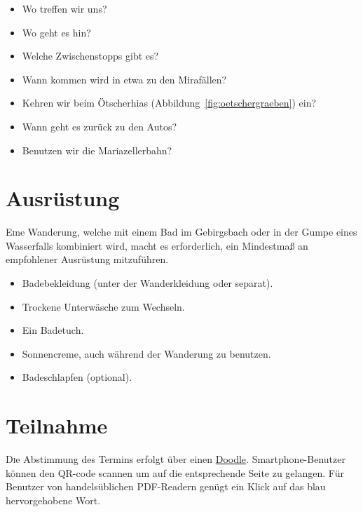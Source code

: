 \documentclass[twoside]{article}
\begin{document}
\begin{multicols}{2}
\begin{itemize}
    \item Wo treffen wir uns?
    \item Wo geht es hin?
    \item Welche Zwischenstopps gibt es?
    \item Wann kommen wird in etwa zu den Mirafällen?
    \item Kehren wir beim Ötscherhias (Abbildung~\ref{fig:oetschergraeben}) ein?
    \item Wann geht es zurück zu den Autos?
    \item Benutzen wir die Mariazellerbahn?
\end{itemize}



\section{Ausrüstung}

\lettrine[nindent=0em,lines=3]{E} ine Wanderung, welche mit einem Bad im Gebirgsbach oder in der Gumpe eines Wasserfalls kombiniert wird, macht es erforderlich,
ein Mindestmaß an empfohlener Ausrüstung mitzuführen.

\begin{itemize}
    \item Badebekleidung (unter der Wanderkleidung oder separat).
    \item Trockene Unterwäsche zum Wechseln.
    \item Ein Badetuch.
    \item Sonnencreme, auch während der Wanderung zu benutzen.
    \item Badeschlapfen (optional).
\end{itemize}


\section{Teilnahme}

\lettrine[nindent=0em,lines=3]{D} ie Abstimmung des Termins erfolgt über einen \href{http://www.doodle.com/m6ywebgyvg6632ig}{Doodle}. Smartphone-Benutzer
können den QR-code scannen um auf die entsprechende Seite zu gelangen. Für Benutzer von handelsüblichen PDF-Readern genügt ein Klick auf das blau hervorgehobene
Wort.



\end{multicols}
\end{document}
